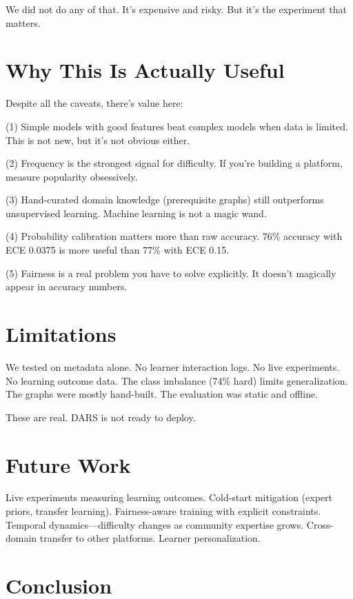 \documentclass[conference]{IEEEtran}
\begin{document}
We did not do any of that. It's expensive and risky. But it's the experiment that matters.

\section{Why This Is Actually Useful}

Despite all the caveats, there's value here:

(1) Simple models with good features beat complex models when data is limited. This is not new, but it's not obvious either.

(2) Frequency is the strongest signal for difficulty. If you're building a platform, measure popularity obsessively.

(3) Hand-curated domain knowledge (prerequisite graphs) still outperforms unsupervised learning. Machine learning is not a magic wand.

(4) Probability calibration matters more than raw accuracy. 76\% accuracy with ECE 0.0375 is more useful than 77\% with ECE 0.15.

(5) Fairness is a real problem you have to solve explicitly. It doesn't magically appear in accuracy numbers.

\section{Limitations}

We tested on metadata alone. No learner interaction logs. No live experiments. No learning outcome data. The class imbalance (74\% hard) limits generalization. The graphs were mostly hand-built. The evaluation was static and offline.

These are real. DARS is not ready to deploy.

\section{Future Work}

Live experiments measuring learning outcomes. Cold-start mitigation (expert priors, transfer learning). Fairness-aware training with explicit constraints. Temporal dynamics—difficulty changes as community expertise grows. Cross-domain transfer to other platforms. Learner personalization.

\section{Conclusion}
\end{document}
